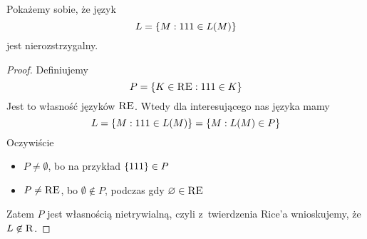 \begin{example}
    Pokażemy sobie, że język
    \[
        L = \set{M : 111 \in L\pars{M}}
    \]
    jest nierozstrzygalny.
    \begin{proof}
        Definiujemy
        \[
            P = \set{K \in \re : 111 \in K}
        \]
        Jest to własność języków \(\textsc{RE}\).
        Wtedy dla interesującego nas języka mamy
        \[
            L = \set{M : 111 \in L\pars{M}} = \set{M : L\pars{M} \in P}
        \]
        Oczywiście
        \begin{itemize}
            \item \(P \neq \emptyset\), bo na przykład \(\set{111} \in P\)
            \item \(P \neq \textsc{RE}\), bo \(\emptyset \not\in P\), podczas gdy \(\varnothing \in \textsc{RE}\)
        \end{itemize}
        Zatem \(P\) jest własnością nietrywialną, czyli z~twierdzenia Rice'a wnioskujemy, że \(L \not\in \textsc{R}\).
    \end{proof}
\end{example}
